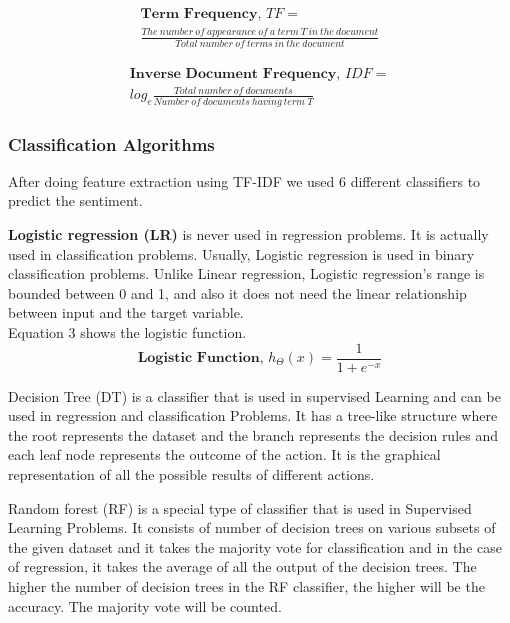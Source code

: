 \documentclass[conference]{IEEEtran}
\begin{document}
\begin{equation}
\begin{multlined}
   \textbf{Term Frequency, } TF=\\\frac{The\:number\:of\:appearance\:of\:a\:term\:T\:in\:the\:document }{Total\:number\:of\:terms\:in\:the\:document}
 \end{multlined}
\end{equation}

\begin{equation}
\begin{multlined}
    \textbf{Inverse Document Frequency, }IDF=\\log_e\frac{Total\:number\:of\:documents}{Number\:of\:documents\:having\:term\:T}
\end{multlined}
\end{equation}



\subsubsection{Classification Algorithms}
After doing feature extraction using TF-IDF we used 6 different classifiers to predict the sentiment. 
\par 
\vspace{0.3cm}
\textbf{Logistic regression (LR)} is never used in regression problems. It is actually used in classification problems. Usually, Logistic regression is used in binary classification problems. Unlike Linear regression, Logistic regression's range is bounded between 0 and 1, and also it does not need the linear relationship between input and the target variable. 
\\
Equation 3 shows the logistic function. 
\begin{equation}
   \textbf{Logistic Function, } h_\Theta(x)=\frac{1}{1 + e^{-x}}
\end{equation}


\par
\vspace{0.3cm}

Decision Tree (DT) is a classifier that is used in supervised Learning and can be used in regression and classification Problems. It has a tree-like structure where the root represents the dataset and the branch represents the decision rules and each leaf node represents the outcome of the action. It is the graphical representation of all the possible results of different actions. 

\par
\vspace{0.3cm}
Random forest (RF) is a special type of classifier that is used in Supervised Learning Problems. It consists of number of decision trees on various subsets of the given dataset and it takes the majority vote for classification and in the case of regression, it takes the average of all the output of the decision trees. The higher the number of decision trees in the RF classifier, the higher will be the accuracy. The majority vote will be counted.   
\end{document}
